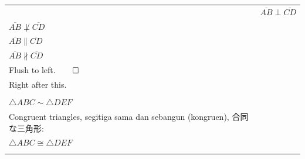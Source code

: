 \documentclass[lualatex]{jlreq}
\begin{document}
\begin{longtable}{p{\cwD} p{\cwE}}
\begin{adjustbox}{valign=t,minipage=\cwD}
    \end{adjustbox}
                     &
    \begin{adjustbox}{valign=t,minipage=\cwE}
        \(\overline{AB} \perp \overline{CD}\)\\
        \(\overline{AB} \not\perp \overline{CD}\)\\
        \(\overline{AB} \parallel \overline{CD}\)\\
        \(\overline{AB} \nparallel \overline{CD}\)\\
        Flush to left.\(\qed\)\\
        Right after this.\qedsymbol{}
    \end{adjustbox}
    \\
    \twocolrowseparatorline{}
    \begin{adjustbox}{valign=t,minipage=\cwD}
        \begin{lstlisting}[language={[LaTeX] TeX},numbers=none,frame=none,breaklines=true,aboveskip=0em,belowskip=0em,gobble=8,]
        Similar triangles, segitiga \mbox{sebangun}, 相似な三角形:\\
        \(\triangle{ABC} \sim \triangle{DEF}\)\\

        Congruent triangles, segitiga sama dan sebangun (kongruen), 合同な三角形:\\
        \(\triangle{ABC} \cong \triangle{DEF}\)\\


\end{lstlisting}
\end{adjustbox}
\end{longtable}
\end{document}
